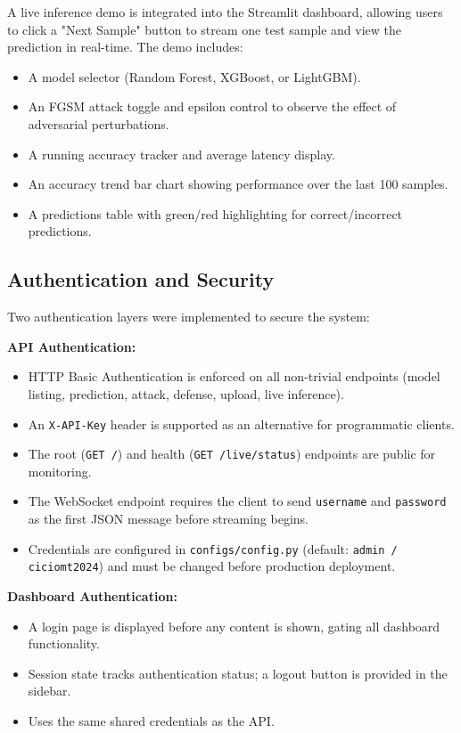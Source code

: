 \documentclass[12pt,a4paper,oneside]{report}
\begin{document}
A live inference demo is integrated into the Streamlit dashboard, allowing users to click a "Next Sample" button to stream one test sample and view the prediction in real-time. The demo includes:
\begin{itemize}
    \item A model selector (Random Forest, XGBoost, or LightGBM).
    \item An FGSM attack toggle and epsilon control to observe the effect of adversarial perturbations.
    \item A running accuracy tracker and average latency display.
    \item An accuracy trend bar chart showing performance over the last 100 samples.
    \item A predictions table with green/red highlighting for correct/incorrect predictions.
\end{itemize}

\subsection{Authentication and Security}

Two authentication layers were implemented to secure the system:

\textbf{API Authentication:}
\begin{itemize}
    \item HTTP Basic Authentication is enforced on all non-trivial endpoints (model listing, prediction, attack, defense, upload, live inference).
    \item An \texttt{X-API-Key} header is supported as an alternative for programmatic clients.
    \item The root (\texttt{GET /}) and health (\texttt{GET /live/status}) endpoints are public for monitoring.
    \item The WebSocket endpoint requires the client to send \texttt{username} and \texttt{password} as the first JSON message before streaming begins.
    \item Credentials are configured in \texttt{configs/config.py} (default: \texttt{admin / ciciomt2024}) and must be changed before production deployment.
\end{itemize}

\textbf{Dashboard Authentication:}
\begin{itemize}
    \item A login page is displayed before any content is shown, gating all dashboard functionality.
    \item Session state tracks authentication status; a logout button is provided in the sidebar.
    \item Uses the same shared credentials as the API.
\end{itemize}
\end{document}
